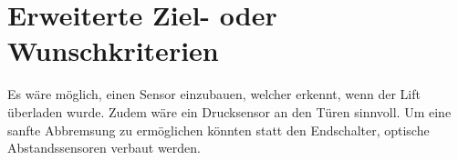 \section{Erweiterte Ziel- oder Wunschkriterien}

Es wäre möglich, einen Sensor einzubauen, welcher erkennt, wenn der Lift überladen wurde. Zudem wäre ein Drucksensor an den Türen sinnvoll. Um eine sanfte Abbremsung zu ermöglichen könnten statt den Endschalter, optische Abstandssensoren verbaut werden.